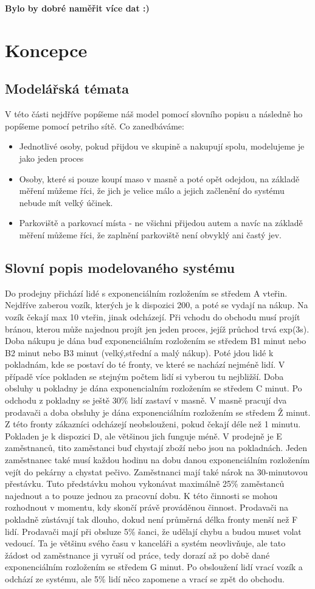 \documentclass[12pt,a4paper,titlepage]{article}
\begin{document}
\textbf{Bylo by dobré naměřit více dat :) }
\section{Koncepce}
\subsection{Modelářská témata}
V této části nejdříve popíšeme náš model pomocí slovního popisu a následně ho popíšeme pomocí petriho sítě. Co zanedbáváme:
\begin{itemize}
\item Jednotlivé osoby, pokud přijdou ve skupině a nakupují spolu, modelujeme je jako jeden proces
\item Osoby, které si pouze koupí maso v masně a poté opět odejdou, na základě měření můžeme říci, že jich je velice málo a jejich začlenění do systému nebude mít velký účinek.
\item Parkoviště a parkovací místa - ne všichni přijedou autem a navíc na základě měření můžeme říci, že zaplnění parkoviště není obvyklý ani častý jev.
\end{itemize}
\subsection{Slovní popis modelovaného systému}
Do prodejny přichází lidé s exponenciálním rozložením se středem A vteřin.  Nejdříve zaberou vozík, kterých je k dispozici 200, a poté se vydají na nákup. Na vozík čekají max 10 vteřin, jinak odcházejí. Při vchodu do obchodu musí projít bránou, kterou může najednou projít jen jeden proces, jejíž průchod trvá exp(3s). Doba nákupu je dána  buď exponenciálním rozložením se středem B1 minut nebo B2 minut nebo B3 minut (velký,střední a malý nákup). Poté jdou lidé k pokladnám, kde se postaví do té fronty, ve které se nachází nejméně lidí. V případě více pokladen se stejným počtem lidí si vyberou tu nejbližší. Doba obsluhy u pokladny je dána exponencialním rozložením se středem C minut. Po odchodu z pokladny se ještě 30\% lidí zastaví v masně. V masně pracují dva prodavači a doba obsluhy je dána exponenciálním rozložením se středem Ž minut. Z této fronty zákazníci odcházejí neobslouženi, pokud čekají déle než 1 minutu. Pokladen je k dispozici D, ale většinou jich funguje méně. V prodejně je E zaměstnanců, tito zaměstanci buď chystají zboží nebo jsou na pokladnách. Jeden zaměstnanec také musí každou hodinu na dobu danou exponenciálním rozložením vejít do pekárny a chystat pečivo. Zaměstnanci mají také nárok na 30-minutovou přestávku. Tuto předstávku mohou vykonávat maximálně 25\% zaměstanců najednout a to pouze jednou za pracovní dobu. K této činnosti se mohou rozhodnout v momentu, kdy skončí právě prováděnou činnost. Prodavači na pokladně zůstávají tak dlouho, dokud není průměrná délka fronty menší než F lidí. Prodavači mají při obsluze 5\% šanci, že udělají chybu a budou muset volat vedoucí. Ta je většinu svého času v kanceláři a systém neovlivňuje, ale tato žádost od zaměstnance ji vyruší od práce, tedy dorazí až po době dané exponenciálním rozložením se středem G minut. Po obsloužení lidí vrací vozík a odchází ze systému, ale 5\% lidí něco zapomene a vrací se zpět do obchodu.
\end{document}
